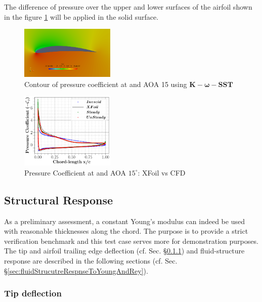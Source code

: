 \documentclass[conf]{new-aiaa}
\begin{document}
The difference of pressure over the upper and lower surfaces of the airfoil  shown in the figure \ref{fig:Cpcontour} will be applied in the solid surface.
%
\begin{figure}[ht!]
\centering
\includegraphics[width=0.4\textwidth]{Figures/CpContour.png}
\caption{Contour of pressure coefficient at and AOA 15 using $\boldsymbol{K-\omega-SST}$}
\label{fig:Cpcontour} 
\end{figure}
%
\begin{figure}[ht!]
\centering
\includegraphics[width=0.4\textwidth]{figs/CfdVsXfoil.pdf}
\caption{Pressure Coefficient at and AOA $15^{\circ}$: XFoil vs CFD}
\label{fig:Cp} 
\end{figure}
%
\subsection{Structural Response}
\label{sec:structure}
As a preliminary assessment, a constant Young's modulus can indeed be used with reasonable thicknesses along the chord.
%
The purpose is to provide a strict verification benchmark and this test case serves more for demonstration purposes.
%
The tip and airfoil trailing edge deflection (cf. Sec. \S\ref{sec:deflection}) and fluid-structure response are described in the following sections (cf. Sec. \S\ref{sec:fluidStrucutreRespnseToYoungAndRey}).
\subsubsection{Tip deflection}
\label{sec:deflection}
\end{document}
